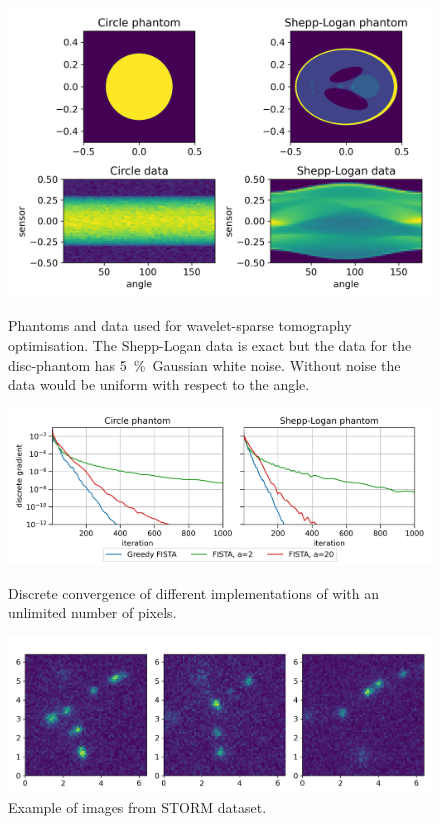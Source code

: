 \documentclass[10pt,a4paper,onecolumn]{article}
\numberwithin{equation}{section}
\begin{document}
\begin{figure}\centering
	\includegraphics[width=.85\textwidth]{haar_data}
	\caption{Phantoms and data used for wavelet-sparse tomography optimisation. The Shepp-Logan data is exact but the data for the disc-phantom has \SI{5}{\percent}\ Gaussian white noise. Without noise the data would be uniform with respect to the angle.}\label{fig: haar data}

	\vspace*{\floatsep}
	
	\includegraphics[width=.85\textwidth]{haar_convergence_short}
	\caption{Discrete convergence of different implementations of  with an unlimited number of pixels.}\label{fig: haar convergence}

	\vspace*{\floatsep}

	\includegraphics[width=.85\textwidth]{STORM_data}
	\caption{Example of images from STORM dataset.}\label{fig: STORM data}
\end{figure}
\end{document}
